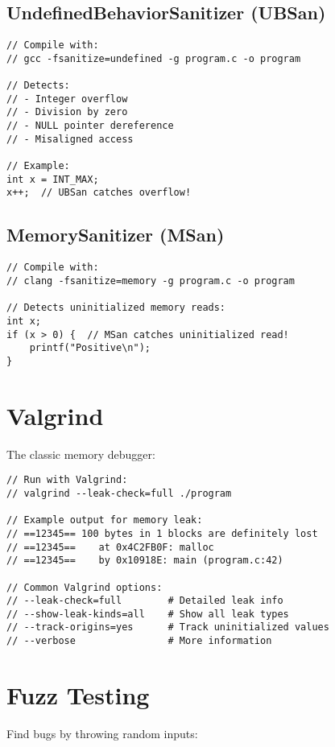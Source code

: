 \subsection{UndefinedBehaviorSanitizer (UBSan)}

\begin{lstlisting}
// Compile with:
// gcc -fsanitize=undefined -g program.c -o program

// Detects:
// - Integer overflow
// - Division by zero
// - NULL pointer dereference
// - Misaligned access

// Example:
int x = INT_MAX;
x++;  // UBSan catches overflow!
\end{lstlisting}

\subsection{MemorySanitizer (MSan)}

\begin{lstlisting}
// Compile with:
// clang -fsanitize=memory -g program.c -o program

// Detects uninitialized memory reads:
int x;
if (x > 0) {  // MSan catches uninitialized read!
    printf("Positive\n");
}
\end{lstlisting}

\section{Valgrind}

The classic memory debugger:

\begin{lstlisting}
// Run with Valgrind:
// valgrind --leak-check=full ./program

// Example output for memory leak:
// ==12345== 100 bytes in 1 blocks are definitely lost
// ==12345==    at 0x4C2FB0F: malloc
// ==12345==    by 0x10918E: main (program.c:42)

// Common Valgrind options:
// --leak-check=full        # Detailed leak info
// --show-leak-kinds=all    # Show all leak types
// --track-origins=yes      # Track uninitialized values
// --verbose                # More information
\end{lstlisting}

\section{Fuzz Testing}

Find bugs by throwing random inputs:

